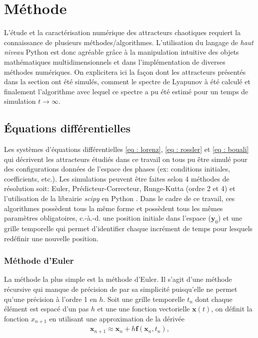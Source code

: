 \section{Méthode} \label{sec: method}
    L'étude et la caractérisation numérique des attracteurs chaotiques requiert la connaissance de plusieurs méthodes/algorithmes. L'utilisation du langage de \textit{haut niveau} Python est donc agréable grâce à la manipulation intuitive des objets mathématiques multidimensionnels et dans l'implémentation de diverses méthodes numériques. On explicitera ici la façon dont les attracteurs présentés dans la section  ont été simulés, comment le spectre de Lyapunov à été calculé et finalement l'algorithme avec lequel ce spectre a pu été estimé pour un temps de simulation $t\to\infty$.

\subsection{Équations différentielles} \label{subsec: res_diff}
    Les systèmes d'équations différentielles \eqref{eq : lorenz}, \eqref{eq : rossler} et \eqref{eq : bouali} qui décrivent les attracteurs étudiés dans ce travail on tous pu être simulé pour des configurations données de l'espace des phases (ex: conditions initiales, coefficients, etc.). Les simulations peuvent être faites selon 4 méthodes de résolution soit: Euler, Prédicteur-Correcteur, Runge-Kutta (ordre 2 et 4) et l'utilisation de la librairie \textit{scipy} en Python \cite{SENECH}. Dans le cadre de ce travail, ces algorithmes possèdent tous la même forme et possèdent tous les mêmes paramètres obligatoires, c.-à.-d. une position initiale dans l'espace ($\bm{y}_0$) et une grille temporelle qui permet d'identifier chaque incrément de temps pour lesquels redéfinir une nouvelle position.

    \subsubsection{Méthode d'Euler} \label{subsubsec: euler}
    La méthode la plus simple est la méthode d'Euler. Il s'agit d'une méthode récursive qui manque de précision de par sa simplicité puisqu'elle ne permet qu'une précision à l'ordre 1 en $h$. Soit une grille temporelle $t_n$ dont chaque élément est espacé d'un pas $h$ et une une fonction vectorielle $\bm{x}(t)$, on définit la fonction $x_{n + 1}$ en utilisant une approximation de la dérivée
    \begin{align*}
        \bm{x}_{n + 1} \approx \bm{x}_n + h\bm{f}(\bm{x}_n, t_n),
    \end{align*}

